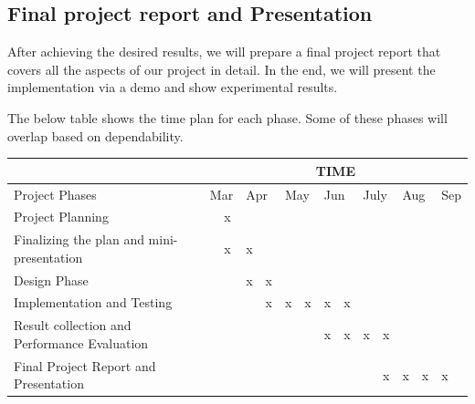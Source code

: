 \documentclass[titlepage]{report}
\begin{document}
\subsection{Final project report and Presentation}
After achieving the desired results, we will prepare a final project report that covers all the aspects of our project in detail. In the end, we will present the implementation via a demo and show experimental results. 

The below table shows the time plan for each phase. Some of these phases will overlap based on dependability.

\pagebreak
\begin{table}[]
\begin{tabular}{|l|l|l|l|l|l|l|l|l|l|l|l|l|l|}
\hline
                                             & \multicolumn{13}{c|}{TIME}                                                                                                                                             \\ \hline
Project Phases                               & \multicolumn{2}{l|}{Mar} & \multicolumn{2}{l|}{Apr} & \multicolumn{2}{l|}{May} & \multicolumn{2}{l|}{Jun} & \multicolumn{2}{l|}{July} & \multicolumn{2}{l|}{Aug} & Sep \\ \hline
Project Planning                             &            & x           &             &            &             &            &             &            &             &             &             &            &     \\ \hline
Finalizing the plan and mini-presentation    &            & x           & x           &            &             &            &             &            &             &             &             &            &     \\ \hline
Design Phase                                 &            &             & x           & x          &             &            &             &            &             &             &             &            &     \\ \hline
Implementation and Testing                   &            &             &             & x          & x           & x          & x           & x          &             &             &             &            &     \\ \hline
Result collection and Performance Evaluation &            &             &             &            &             &            & x           & x          & x           & x           &             &            &     \\ \hline
Final Project Report and Presentation        &            &             &             &            &             &            &             &            &             & x           & x           & x          & x   \\ \hline
\end{tabular}
\end{table}
\end{document}
